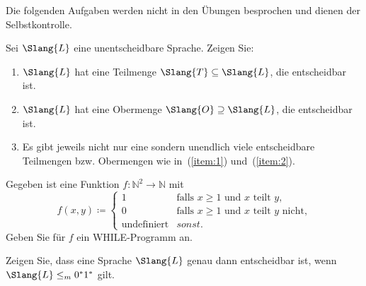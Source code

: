 \documentclass[german]{latteachCD}[2017/03/28]
\begin{document}
\maketitle

\begin{mdframed}
  Die folgenden Aufgaben werden nicht in den Übungen besprochen und dienen der
  Selbstkontrolle.

  \renewcommand{\theexercise}{\Alph{exercise}}
  \setcounter{exercise}{7}

  \begin{exercise}
    Sei $\Slang{L}$ eine unentscheidbare Sprache. Zeigen Sie:
    \begin{enumerate}
    \item\label{item:1} $\Slang{L}$ hat eine Teilmenge $\Slang{T}\subseteq \Slang{L}$, die
      entscheidbar ist.
    \item\label{item:2} $\Slang{L}$ hat eine Obermenge $\Slang{O}\supseteq
      \Slang{L}$, die entscheidbar ist.
    \item Es gibt jeweils nicht nur eine sondern unendlich viele entscheidbare
      Teilmengen bzw. Obermengen wie in~(\ref{item:1}) und~(\ref{item:2}).
    \end{enumerate}
  \end{exercise}

  \begin{exercise}
    Gegeben ist eine Funktion $f \colon \mathbb N^{2} \to \mathbb N$ mit
    \begin{equation*}
      f(x,y) \coloneqq
      \begin{cases}
        1 & \text{falls $x \geq 1$ und $x$ teilt $y$,}\\
        0 & \text{falls $x \geq 1$ und $x$ teilt $y$ nicht,}\\
        \text{undefiniert} & sonst.
      \end{cases}
    \end{equation*}
    Geben Sie für $f$ ein WHILE-Programm an.
  \end{exercise}

\end{mdframed}

\vspace*{0.5\baselineskip}

\setcounter{exercise}{0}

\begin{exercise}
  Zeigen Sie, dass eine Sprache $\Slang{L}$ genau dann entscheidbar ist, wenn
  $\Slang{L} \leq_{m} 0^{*}1^{*}$ gilt.
\end{exercise}
\end{document}
